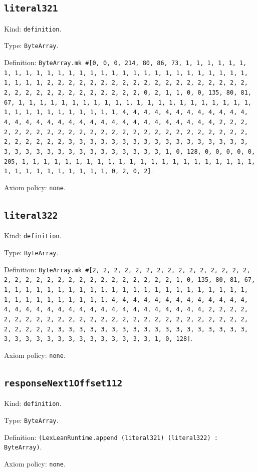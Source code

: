 \documentclass[11pt]{article}
\begin{document}
\subsection*{\texttt{literal321}}
\noindent Kind: \texttt{definition}.\par
\noindent Type: \texttt{ByteArray}.\par
\noindent Definition: \texttt{ByteArray.mk \#[0, 0, 0, 214, 80, 86, 73, 1, 1, 1, 1, 1, 1, 1, 1, 1, 1, 1, 1, 1, 1, 1, 1, 1, 1, 1, 1, 1, 1, 1, 1, 1, 1, 1, 1, 1, 1, 1, 1, 1, 2, 2, 2, 2, 2, 2, 2, 2, 2, 2, 2, 2, 2, 2, 2, 2, 2, 2, 2, 2, 2, 2, 2, 2, 2, 2, 2, 2, 2, 2, 2, 2, 0, 2, 1, 1, 0, 0, 135, 80, 81, 67, 1, 1, 1, 1, 1, 1, 1, 1, 1, 1, 1, 1, 1, 1, 1, 1, 1, 1, 1, 1, 1, 1, 1, 1, 1, 1, 1, 1, 1, 1, 1, 1, 1, 4, 4, 4, 4, 4, 4, 4, 4, 4, 4, 4, 4, 4, 4, 4, 4, 4, 4, 4, 4, 4, 4, 4, 4, 4, 4, 4, 4, 4, 4, 4, 4, 2, 2, 2, 2, 2, 2, 2, 2, 2, 2, 2, 2, 2, 2, 2, 2, 2, 2, 2, 2, 2, 2, 2, 2, 2, 2, 2, 2, 2, 2, 2, 2, 3, 3, 3, 3, 3, 3, 3, 3, 3, 3, 3, 3, 3, 3, 3, 3, 3, 3, 3, 3, 3, 3, 3, 3, 3, 3, 3, 3, 3, 3, 3, 3, 1, 0, 128, 0, 0, 0, 0, 0, 205, 1, 1, 1, 1, 1, 1, 1, 1, 1, 1, 1, 1, 1, 1, 1, 1, 1, 1, 1, 1, 1, 1, 1, 1, 1, 1, 1, 1, 1, 1, 1, 1, 0, 2, 0, 2]}.\par
\noindent Axiom policy: \texttt{none}.\par
\subsection*{\texttt{literal322}}
\noindent Kind: \texttt{definition}.\par
\noindent Type: \texttt{ByteArray}.\par
\noindent Definition: \texttt{ByteArray.mk \#[2, 2, 2, 2, 2, 2, 2, 2, 2, 2, 2, 2, 2, 2, 2, 2, 2, 2, 2, 2, 2, 2, 2, 2, 2, 2, 2, 2, 2, 2, 2, 1, 0, 135, 80, 81, 67, 1, 1, 1, 1, 1, 1, 1, 1, 1, 1, 1, 1, 1, 1, 1, 1, 1, 1, 1, 1, 1, 1, 1, 1, 1, 1, 1, 1, 1, 1, 1, 1, 1, 4, 4, 4, 4, 4, 4, 4, 4, 4, 4, 4, 4, 4, 4, 4, 4, 4, 4, 4, 4, 4, 4, 4, 4, 4, 4, 4, 4, 4, 4, 4, 4, 2, 2, 2, 2, 2, 2, 2, 2, 2, 2, 2, 2, 2, 2, 2, 2, 2, 2, 2, 2, 2, 2, 2, 2, 2, 2, 2, 2, 2, 2, 2, 2, 3, 3, 3, 3, 3, 3, 3, 3, 3, 3, 3, 3, 3, 3, 3, 3, 3, 3, 3, 3, 3, 3, 3, 3, 3, 3, 3, 3, 3, 3, 3, 3, 1, 0, 128]}.\par
\noindent Axiom policy: \texttt{none}.\par
\subsection*{\texttt{responseNext1Offset112}}
\noindent Kind: \texttt{definition}.\par
\noindent Type: \texttt{ByteArray}.\par
\noindent Definition: \texttt{(LexLeanRuntime.append (literal321) (literal322) : ByteArray)}.\par
\noindent Axiom policy: \texttt{none}.\par
\end{document}
